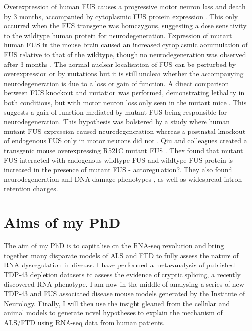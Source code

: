 Overexpression of human FUS causes a progressive motor neuron loss and death by 3 months, accompanied by cytoplasmic FUS protein expression \citep{Mitchell2013}. 
This only occurred when the FUS transgene was homozygous, suggesting a dose sensitivity to the wildtype human protein for neurodegeneration. 
Expression of mutant human FUS in the mouse brain caused an increased cytoplasmic accumulation of FUS relative to that of the wildtype, though no neurodegeneration was observed after 3 months \citep{Verbeeck2012}. 
The normal nuclear localisation of FUS can be perturbed by overexpression or by mutations but it is still unclear whether the accompanying neurodegeneration is due to a loss or gain of function. 
A direct comparison between FUS knockout and mutation was performed, demonstrating lethality in both conditions, but with motor neuron loss only seen in the mutant mice \citep{Scekic-zahirovic2016}. This suggests a gain of function mediated by mutant FUS being responsible for neurodegeneration. 
This hypothesis was bolstered by a study where human mutant FUS expression caused neurodegeneration whereas a postnatal knockout of endogenous FUS only in motor neurons did not \citep{Sharma2016}. 
Qiu and colleagues created a transgenic mouse overexpressing R521C mutant FUS \citeyear{Qiu2014}. 
They found that mutant FUS interacted with endogenous wildtype FUS and wildtype FUS protein is increased in the presence of mutant FUS - autoregulation?. They also found neurodegeneration and DNA damage phenotypes , as well as widespread intron retention changes. 







\section{Aims of my PhD} %

The aim of my PhD is to capitalise on the RNA-seq revolution and bring together many disparate models of ALS and FTD to fully assess the nature of RNA dysregulation in disease.
I have performed a meta-analysis of published TDP-43 depletion datasets to assess the evidence of cryptic splicing, a recently discovered RNA phenotype. I am now in the middle of analysing a series of new TDP-43 and FUS associated disease mouse models generated by the Institute of Neurology. Finally, I will then use the insight gleaned from the cellular and animal models to generate novel hypotheses to explain the mechanism of ALS/FTD using RNA-seq data from human patients.

%
%
%
%	
